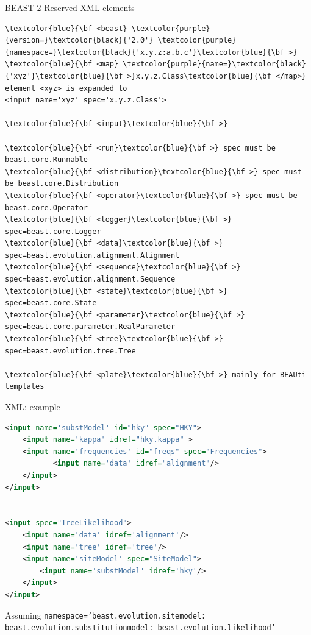 \documentclass{beamer}
\theoremstyle{definition}
\begin{document}
\begin{frame}[containsverbatim]{BEAST 2 Reserved XML elements}

{\small
\begin{Verbatim}[commandchars=\\\{\}]
\textcolor{blue}{\bf <beast} \textcolor{purple}{version=}\textcolor{black}{'2.0'} \textcolor{purple}{namespace=}\textcolor{black}{'x.y.z:a.b.c'}\textcolor{blue}{\bf >}
\textcolor{blue}{\bf <map} \textcolor{purple}{name=}\textcolor{black}{'xyz'}\textcolor{blue}{\bf >}x.y.z.Class\textcolor{blue}{\bf </map>}
element <xyz> is expanded to 
<input name='xyz' spec='x.y.z.Class'>

\textcolor{blue}{\bf <input}\textcolor{blue}{\bf >}

\textcolor{blue}{\bf <run}\textcolor{blue}{\bf >} spec must be beast.core.Runnable
\textcolor{blue}{\bf <distribution}\textcolor{blue}{\bf >} spec must be beast.core.Distribution
\textcolor{blue}{\bf <operator}\textcolor{blue}{\bf >} spec must be beast.core.Operator
\textcolor{blue}{\bf <logger}\textcolor{blue}{\bf >}    spec=beast.core.Logger
\textcolor{blue}{\bf <data}\textcolor{blue}{\bf >}      spec=beast.evolution.alignment.Alignment
\textcolor{blue}{\bf <sequence}\textcolor{blue}{\bf >}  spec=beast.evolution.alignment.Sequence
\textcolor{blue}{\bf <state}\textcolor{blue}{\bf >}     spec=beast.core.State
\textcolor{blue}{\bf <parameter}\textcolor{blue}{\bf >} spec=beast.core.parameter.RealParameter
\textcolor{blue}{\bf <tree}\textcolor{blue}{\bf >}      spec=beast.evolution.tree.Tree

\textcolor{blue}{\bf <plate}\textcolor{blue}{\bf >} mainly for BEAUti templates
\end{Verbatim}
}
\end{frame}



\begin{frame}[containsverbatim]{XML: example}

{\small

\begin{lstlisting}[language=XML]
<input name='substModel' id="hky" spec="HKY">
    <input name='kappa' idref="hky.kappa" >
    <input name='frequencies' id="freqs" spec="Frequencies">
           <input name='data' idref="alignment"/>
    </input>
</input>


<input spec="TreeLikelihood">
    <input name='data' idref='alignment'/>
    <input name='tree' idref='tree'/>
    <input name='siteModel' spec="SiteModel">
        <input name='substModel' idref='hky'/>
    </input>
</input>
\end{lstlisting}


\color{blue}Assuming {\tt namespace='beast.evolution.sitemodel:
beast.evolution.substitutionmodel:\
beast.evolution.likelihood'}
}
\end{frame}
\end{document}
